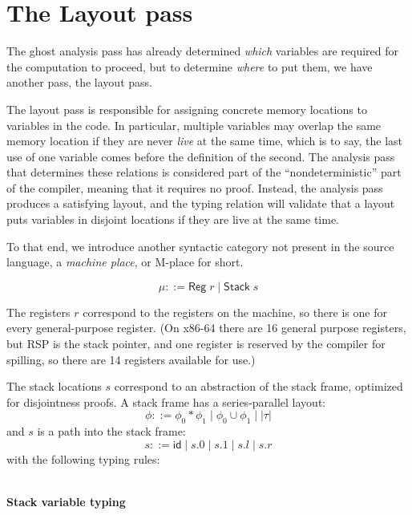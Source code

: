 \documentclass[acmsmall,nonacm]{acmart}
\newcommand{\proves}{\vdash}
\newcommand{\judgment}[2][]{\noindent\\\textbf{#1}\hspace{\stretch{1}}\fbox{$#2$}\nopagebreak}
\newcommand*{\axiom}[2][]{\infer[#1]{}{#2}}
\begin{document}
\section{The Layout pass}\label{sec:layout}

The ghost analysis pass has already determined \emph{which} variables are required for the computation to proceed, but to determine \emph{where} to put them, we have another pass, the layout pass.

The layout pass is responsible for assigning concrete memory locations to variables in the code. In particular, multiple variables may overlap the same memory location if they are never \emph{live} at the same time, which is to say, the last use of one variable comes before the definition of the second. The analysis pass that determines these relations is considered part of the ``nondeterministic'' part of the compiler, meaning that it requires no proof. Instead, the analysis pass produces a satisfying layout, and the typing relation will validate that a layout puts variables in disjoint locations if they are live at the same time.

To that end, we introduce another syntactic category not present in the source language, a \emph{machine place}, or M-place for short.

$$\mu::=\mathsf{Reg}\;r\mid \mathsf{Stack}\;s$$

The registers $r$ correspond to the registers on the machine, so there is one for every general-purpose register. (On x86-64 there are 16 general purpose registers, but RSP is the stack pointer, and one register is reserved by the compiler for spilling, so there are 14 registers available for use.)

The stack locations $s$ correspond to an abstraction of the stack frame, optimized for disjointness proofs. A stack frame has a series-parallel layout:
$$\phi ::= \phi_0\ast\phi_1\mid \phi_0\cup \phi_1\mid |\tau|$$
and $s$ is a path into the stack frame:
$$s ::= \mathsf{id}\mid s.0\mid s.1 \mid s.l \mid s.r$$
with the following typing rules:

\judgment[Stack variable typing]{\phi\proves s:\phi'}
\end{document}
